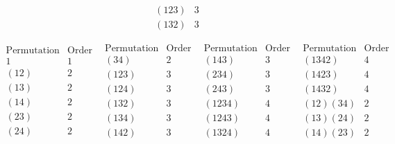 \begin{problems}
\begin{solalph}
$$\begin{array}{c|c}
            (123) & 3 \\
            (132) & 3
        \end{array}$$
        \item 
        $$\begin{array}{c|c}
                \text{Permutation} & \text{Order} \\
                \hline
                1 & 1 \\
                (12) & 2 \\
                (13) & 2 \\
                (14) & 2 \\
                (23) & 2 \\
                (24) & 2
        \end{array}\enspace
        \begin{array}{c|c}
            \text{Permutation} & \text{Order} \\
            \hline
            (34) & 2 \\
            (123) & 3 \\
            (124) & 3 \\
            (132) & 3 \\
            (134) & 3 \\
            (142) & 3
        \end{array}\enspace
        \begin{array}{c|c}
            \text{Permutation} & \text{Order} \\
            \hline
            (143) & 3 \\
            (234) & 3 \\
            (243) & 3 \\
            (1234) & 4 \\
            (1243) & 4 \\
            (1324) & 4
        \end{array}\enspace
        \begin{array}{c|c}
            \text{Permutation} & \text{Order} \\
            \hline
            (1342) & 4 \\
            (1423) & 4 \\
            (1432) & 4 \\
            (12)(34) & 2 \\
            (13)(24) & 2 \\
            (14)(23) & 2
        \end{array}$$
    \end{solalph}

\end{problems}
